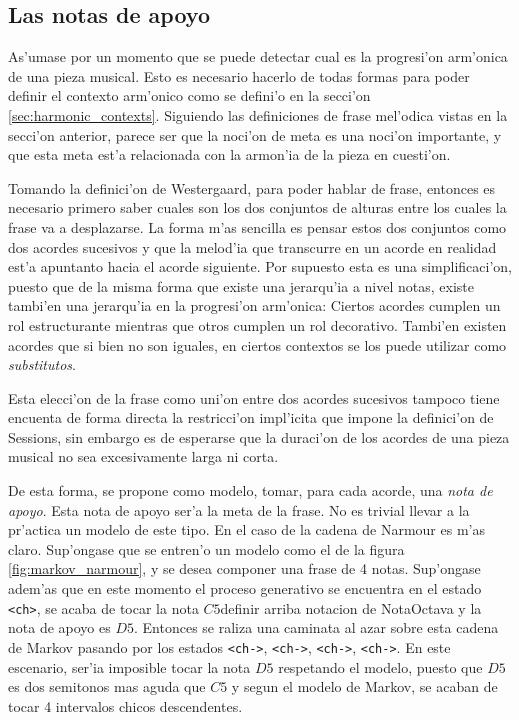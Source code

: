 \subsection{Las notas de apoyo}
As'umase por un momento que se puede detectar cual es la progresi'on arm'onica de una pieza musical. Esto es necesario hacerlo de todas 
formas para poder definir el contexto arm'onico como se defini'o en la secci'on \ref{sec:harmonic_contexts}. Siguiendo las definiciones
de frase mel'odica vistas en la secci'on anterior, parece ser que la noci'on de meta es una noci'on importante, y que esta meta
est'a relacionada con la armon'ia de la pieza en cuesti'on. 

Tomando la definici'on de Westergaard, para poder hablar de frase, entonces es necesario primero saber cuales son los dos conjuntos de 
alturas entre los cuales la frase va a desplazarse. La forma m'as sencilla es pensar estos dos conjuntos como dos acordes sucesivos
y que la melod'ia que transcurre en un acorde en realidad est'a apuntanto hacia el acorde siguiente. Por supuesto
esta es una simplificaci'on, puesto que de la misma forma que existe una jerarqu'ia a nivel notas, existe tambi'en una jerarqu'ia
en la progresi'on arm'onica: Ciertos acordes cumplen un rol estructurante mientras que otros cumplen un rol decorativo. Tambi'en
existen acordes que si bien no son iguales, en ciertos contextos se los puede utilizar como \emph{substitutos}. 

Esta elecci'on de la frase como uni'on entre dos acordes sucesivos tampoco tiene encuenta de forma directa la restricci'on 
impl'icita que impone la definici'on de Sessions, sin embargo es de esperarse que la duraci'on de los acordes de una pieza musical
no sea excesivamente larga ni corta. 

De esta forma, se propone como modelo, tomar, para cada acorde, una \emph{nota de apoyo}. Esta nota de apoyo ser'a la meta de 
la frase. No es trivial llevar a la pr'actica un modelo de este tipo. En el caso de la cadena de Narmour es m'as claro. Sup'ongase
que se entren'o un modelo como el de la figura \ref{fig:markov_narmour}, y se desea componer una frase de 4 notas. Sup'ongase
adem'as que en este momento el proceso generativo se encuentra en el estado \texttt{<ch>}, se acaba de tocar la nota $C5$\alert{definir arriba notacion de NotaOctava} y la nota de apoyo es $D5$. Entonces se raliza una caminata al azar sobre esta cadena de Markov pasando 
por los estados \texttt{<ch->}, \texttt{<ch->}, \texttt{<ch->}, \texttt{<ch->}. En este escenario, ser'ia imposible tocar la nota
$D5$ respetando el modelo, puesto que $D5$ es dos semitonos mas aguda que $C5$ y segun el modelo de Markov, se acaban de tocar 4 
intervalos chicos descendentes. 

